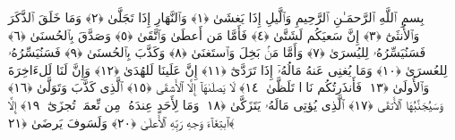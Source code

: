 
  
    
  
    
    

\nopagebreak
  بِسمِ ٱللَّهِ ٱلرَّحمَـٰنِ ٱلرَّحِيمِ
  وَٱلَّيلِ إِذَا يَغشَىٰ ﴿١﴾
 وَٱلنَّهَارِ إِذَا تَجَلَّىٰ ﴿٢﴾
 وَمَا خَلَقَ ٱلذَّكَرَ وَٱلأُنثَىٰٓ ﴿٣﴾
 إِنَّ سَعيَكُم لَشَتَّىٰ ﴿٤﴾
 فَأَمَّا مَن أَعطَىٰ وَٱتَّقَىٰ ﴿٥﴾
 وَصَدَّقَ بِٱلحُسنَىٰ ﴿٦﴾
 فَسَنُيَسِّرُهُۥ لِليُسرَىٰ ﴿٧﴾
 وَأَمَّا مَنۢ بَخِلَ وَٱستَغنَىٰ ﴿٨﴾
 وَكَذَّبَ بِٱلحُسنَىٰ ﴿٩﴾
 فَسَنُيَسِّرُهُۥ لِلعُسرَىٰ ﴿١٠﴾
 وَمَا يُغنِى عَنهُ مَالُهُۥٓ إِذَا تَرَدَّىٰٓ ﴿١١﴾
 إِنَّ عَلَينَا لَلهُدَىٰ ﴿١٢﴾
 وَإِنَّ لَنَا لَلءَاخِرَةَ وَٱلأُولَىٰ ﴿١٣﴾
 فَأَنذَرتُكُم نَارًۭا تَلَظَّىٰ ﴿١٤﴾
 لَا يَصلَىٰهَآ إِلَّا ٱلأَشقَى ﴿١٥﴾
 ٱلَّذِى كَذَّبَ وَتَوَلَّىٰ ﴿١٦﴾
 وَسَيُجَنَّبُهَا ٱلأَتقَى ﴿١٧﴾
 ٱلَّذِى يُؤتِى مَالَهُۥ يَتَزَكَّىٰ ﴿١٨﴾
 وَمَا لِأَحَدٍ عِندَهُۥ مِن نِّعمَةٍۢ تُجزَىٰٓ ﴿١٩﴾
 إِلَّا ٱبتِغَآءَ وَجهِ رَبِّهِ ٱلأَعلَىٰ ﴿٢٠﴾
 وَلَسَوفَ يَرضَىٰ ﴿٢١﴾
 
